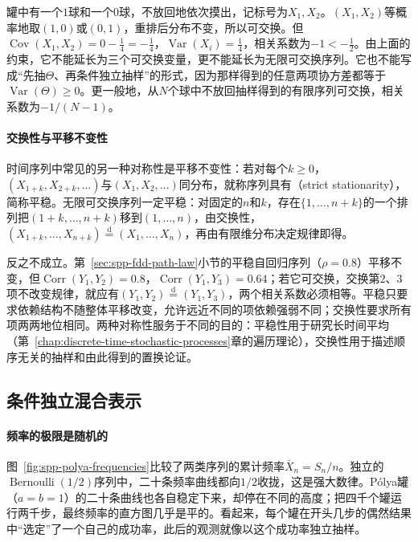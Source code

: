 \begin{example}[不放回抽取]
\label{ex:spp-without-replacement}
罐中有一个$1$球和一个$0$球，不放回地依次摸出，记标号为$X_1,X_2$。$(X_1,X_2)$等概率地取$(1,0)$或$(0,1)$，重排后分布不变，所以可交换。但$\operatorname{Cov}(X_1,X_2)=0-\frac14=-\frac14$，$\operatorname{Var}(X_i)=\frac14$，相关系数为$-1<-\frac12$。由上面的约束，它不能延长为三个可交换变量，更不能延长为无限可交换序列。它也不能写成“先抽$\Theta$、再条件独立抽样”的形式，因为那样得到的任意两项协方差都等于$\operatorname{Var}(\Theta)\ge0$。更一般地，从$N$个球中不放回抽样得到的有限序列可交换，相关系数为$-1/(N-1)$。
\end{example}

\paragraph{交换性与平移不变性}
时间序列中常见的另一种对称性是平移不变性：若对每个$k\ge0$，$(X_{1+k},X_{2+k},\ldots)$与$(X_1,X_2,\ldots)$同分布，就称序列具有（strict stationarity），简称平稳。无限可交换序列一定平稳：对固定的$n$和$k$，存在$\{1,\ldots,n+k\}$的一个排列把$(1+k,\ldots,n+k)$移到$(1,\ldots,n)$，由交换性，$(X_{1+k},\ldots,X_{n+k})\overset{\mathrm d}{=}(X_1,\ldots,X_n)$，再由有限维分布决定规律即得。

反之不成立。第~\ref{sec:spp-fdd-path-law}小节的平稳自回归序列（$\rho=0.8$）平移不变，但$\operatorname{Corr}(Y_1,Y_2)=0.8$，$\operatorname{Corr}(Y_1,Y_3)=0.64$；若它可交换，交换第$2$、$3$项不改变规律，就应有$(Y_1,Y_2)\overset{\mathrm d}{=}(Y_1,Y_3)$，两个相关系数必须相等。平稳只要求依赖结构不随整体平移改变，允许远近不同的项依赖强弱不同；交换性要求所有项两两地位相同。两种对称性服务于不同的目的：平稳性用于研究长时间平均（第~\ref{chap:discrete-time-stochastic-processes}章的遍历理论），交换性用于描述顺序无关的抽样和由此得到的置换论证。

\subsection{条件独立混合表示}
\label{sec:spp-de-finetti}

\paragraph{频率的极限是随机的}
图~\ref{fig:spp-polya-frequencies}比较了两类序列的累计频率$\bar X_n=S_n/n$。独立的$\operatorname{Bernoulli}(1/2)$序列中，二十条频率曲线都向$1/2$收拢，这是强大数律。Pólya罐（$a=b=1$）的二十条曲线也各自稳定下来，却停在不同的高度；把四千个罐运行两千步，最终频率的直方图几乎是平的。看起来，每个罐在开头几步的偶然结果中“选定”了一个自己的成功率，此后的观测就像以这个成功率独立抽样。

